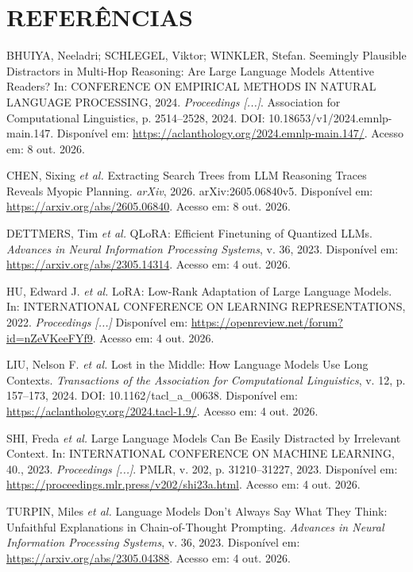 \documentclass[12pt,a4paper]{article}
\begin{document}
\section*{REFERÊNCIAS}
\begin{singlespace}
\raggedright
\noindent BHUIYA, Neeladri; SCHLEGEL, Viktor; WINKLER, Stefan. Seemingly Plausible Distractors in Multi-Hop Reasoning: Are Large Language Models Attentive Readers? In: CONFERENCE ON EMPIRICAL METHODS IN NATURAL LANGUAGE PROCESSING, 2024. \textit{Proceedings [...]}. Association for Computational Linguistics, p. 2514--2528, 2024. DOI: 10.18653/v1/2024.emnlp-main.147. Disponível em: \url{https://aclanthology.org/2024.emnlp-main.147/}. Acesso em: 8 out. 2026.\par\medskip
\noindent CHEN, Sixing \textit{et al.} Extracting Search Trees from LLM Reasoning Traces Reveals Myopic Planning. \textit{arXiv}, 2026. arXiv:2605.06840v5. Disponível em: \url{https://arxiv.org/abs/2605.06840}. Acesso em: 8 out. 2026.\par\medskip
\noindent DETTMERS, Tim \textit{et al.} QLoRA: Efficient Finetuning of Quantized LLMs. \textit{Advances in Neural Information Processing Systems}, v. 36, 2023. Disponível em: \url{https://arxiv.org/abs/2305.14314}. Acesso em: 4 out. 2026.\par\medskip
\noindent HU, Edward J. \textit{et al.} LoRA: Low-Rank Adaptation of Large Language Models. In: INTERNATIONAL CONFERENCE ON LEARNING REPRESENTATIONS, 2022. \textit{Proceedings [...]} Disponível em: \url{https://openreview.net/forum?id=nZeVKeeFYf9}. Acesso em: 4 out. 2026.\par\medskip
\noindent LIU, Nelson F. \textit{et al.} Lost in the Middle: How Language Models Use Long Contexts. \textit{Transactions of the Association for Computational Linguistics}, v. 12, p. 157--173, 2024. DOI: 10.1162/tacl\_a\_00638. Disponível em: \url{https://aclanthology.org/2024.tacl-1.9/}. Acesso em: 4 out. 2026.\par\medskip
\noindent SHI, Freda \textit{et al.} Large Language Models Can Be Easily Distracted by Irrelevant Context. In: INTERNATIONAL CONFERENCE ON MACHINE LEARNING, 40., 2023. \textit{Proceedings [...]}. PMLR, v. 202, p. 31210--31227, 2023. Disponível em: \url{https://proceedings.mlr.press/v202/shi23a.html}. Acesso em: 4 out. 2026.\par\medskip
\noindent TURPIN, Miles \textit{et al.} Language Models Don't Always Say What They Think: Unfaithful Explanations in Chain-of-Thought Prompting. \textit{Advances in Neural Information Processing Systems}, v. 36, 2023. Disponível em: \url{https://arxiv.org/abs/2305.04388}. Acesso em: 4 out. 2026.\par\medskip

\end{singlespace}
\end{document}
